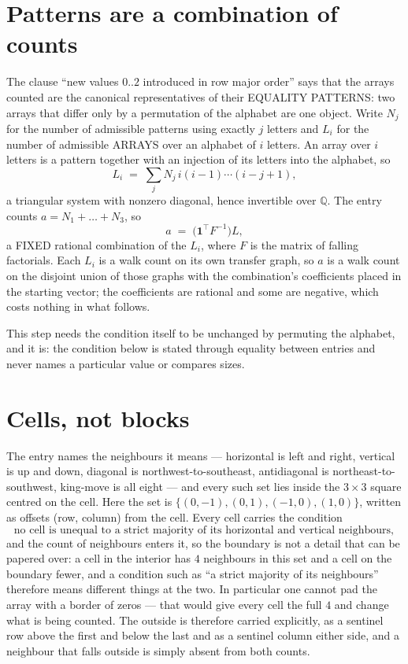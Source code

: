 \documentclass[11pt,a4paper]{article}
\theoremstyle{plain}
\theoremstyle{definition}
\begin{document}
\section{Patterns are a combination of counts}

The clause ``new values $0..2$ introduced in row major order'' says that the arrays
counted are the canonical representatives of their EQUALITY PATTERNS: two arrays that differ
only by a permutation of the alphabet are one object. Write $N_j$ for the number of admissible
patterns using exactly $j$ letters and $L_i$ for the number of admissible ARRAYS over an
alphabet of $i$ letters. An array over $i$ letters is a pattern together with an injection of
its letters into the alphabet, so
\[
L_i\;=\;\sum_{j}N_j\,i(i-1)\cdots(i-j+1),
\]
a triangular system with nonzero diagonal, hence invertible over $\mathbb{Q}$. The entry
counts $a=N_1+\dots+N_{3}$, so
\[
a\;=\;\bigl(\mathbf{1}^{\!\top}F^{-1}\bigr)L ,
\]
a FIXED rational combination of the $L_i$, where $F$ is the matrix of falling factorials.
Each $L_i$ is a walk count on its own transfer graph, so $a$ is a walk count on the disjoint
union of those graphs with the combination's coefficients placed in the starting vector; the
coefficients are rational and some are negative, which costs nothing in what follows.

This step needs the condition itself to be unchanged by permuting the alphabet, and it is:
the condition below is stated through equality between entries and never names a particular
value or compares sizes.

\section{Cells, not blocks}

The entry names the neighbours it means --- horizontal is left and right, vertical is up and
down, diagonal is northwest-to-southeast, antidiagonal is northeast-to-southwest, king-move is
all eight --- and every such set lies inside the $3\times3$ square centred on the cell. Here
the set is $\{(0,-1), (0,1), (-1,0), (1,0)\}$, written as offsets (row, column) from the cell. Every cell carries
the condition
\[
\text{no cell is unequal to a strict majority of its horizontal and vertical neighbours},
\]
and the count of neighbours enters it, so the boundary is not a detail that can be papered
over: a cell in the interior has $4$ neighbours in this set and a cell on the boundary
fewer, and a condition such as ``a strict majority of its neighbours'' therefore means
different things at the two. In particular one cannot pad the array with a border of zeros ---
that would give every cell the full $4$ and change what is being counted. The outside is
therefore carried
explicitly, as a sentinel row above the first and below the last and as a sentinel column
either side, and a neighbour that falls outside is simply absent from both counts.
\end{document}
